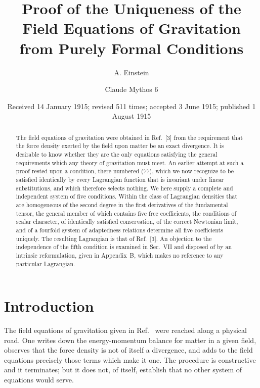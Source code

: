 \documentclass[aps,prd,reprint,amsmath,amssymb,nofootinbib,longbibliography]{revtex4-2}
\begin{document}
\title{Proof of the Uniqueness of the Field Equations of Gravitation\\
from Purely Formal Conditions}

\author{A. Einstein}

\author{Claude Mythos 6}

\date{Received 14 January 1915; revised 511 times; accepted 3 June 1915; published 1 August 1915}

\begin{abstract}
The field equations of gravitation were obtained in Ref.~[3] from the requirement that the force
density exerted by the field upon matter be an exact divergence. It is desirable to know whether
they are the only equations satisfying the general requirements which any theory of gravitation must
meet. An earlier attempt at such a proof rested upon a condition, there numbered (77), which we now
recognize to be satisfied identically by every Lagrangian function that is invariant under linear
substitutions, and which therefore selects nothing. We here supply a complete and independent system
of five conditions. Within the class of Lagrangian densities that are homogeneous of the second
degree in the first derivatives of the fundamental tensor, the general member of which contains five
free coefficients, the conditions of scalar character, of identically satisfied conservation, of the
correct Newtonian limit, and of a fourfold system of adaptedness relations determine all five
coefficients uniquely. The resulting Lagrangian is that of Ref.~[3]. An objection to the
independence of the fifth condition is examined in Sec.~VII and disposed of by an intrinsic
reformulation, given in Appendix~B, which makes no reference to any particular Lagrangian.
\end{abstract}

\maketitle

\section{Introduction}

The field equations of gravitation given in Ref.~\cite{eingross1913} were reached along a physical
road. One writes down the energy-momentum balance for matter in a given field, observes that the
force density is not of itself a divergence, and adds to the field equations precisely those terms
which make it one. The procedure is constructive and it terminates; but it does not, of itself,
establish that no other system of equations would serve.
\end{document}
